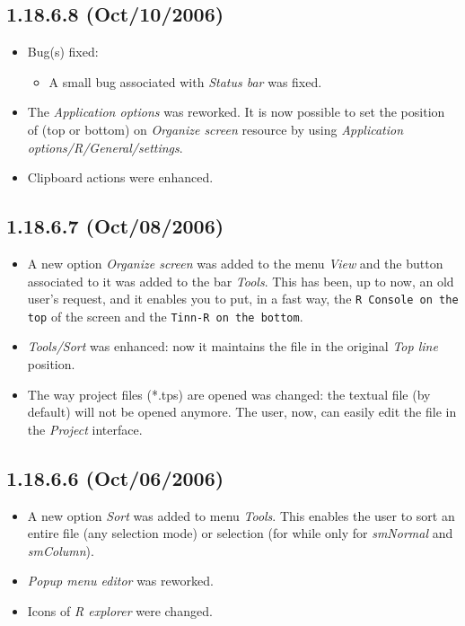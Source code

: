 \subsection*{1.18.6.8 (Oct/10/2006)}
\begin{itemize}
  \item Bug(s) fixed:
    \begin{itemize}
      \item A small bug associated with \textit{Status bar} was fixed.
    \end{itemize}
  \item The \textit{Application options} was reworked. It is now possible
    to set the position of \RR{} (top or bottom) on \textit{Organize screen}
    resource by using \textit{Application options/R/General/settings}.
  \item Clipboard actions were enhanced.
\end{itemize}


\subsection*{1.18.6.7 (Oct/08/2006)}
\begin{itemize}
  \item A new option \textit{Organize screen} was added to the menu
    \textit{View} and the button associated to it was added to the
    bar \textit{Tools}. This has been, up to now, an old user's request,
    and it enables you to put, in a fast way, the \texttt{R Console on
      the top} of the screen and the \texttt{Tinn-R on the bottom}.
  \item \textit{Tools/Sort} was enhanced: now it maintains the file
    in the original \textit{Top line} position.
  \item The way project files (*.tps) are opened was changed: the
    textual file (by default) will not be opened anymore. The user,
    now, can easily edit the file in the \textit{Project} interface.
\end{itemize}


\subsection*{1.18.6.6 (Oct/06/2006)}
\begin{itemize}
  \item A new option \textit{Sort} was added to menu \textit{Tools}.
    This enables the user to sort an entire file (any selection mode)
    or selection (for while only for \textit{smNormal} and
    \textit{smColumn}).
  \item \textit{Popup menu editor} was reworked.
  \item Icons of \textit{R explorer} were changed.
\end{itemize}


